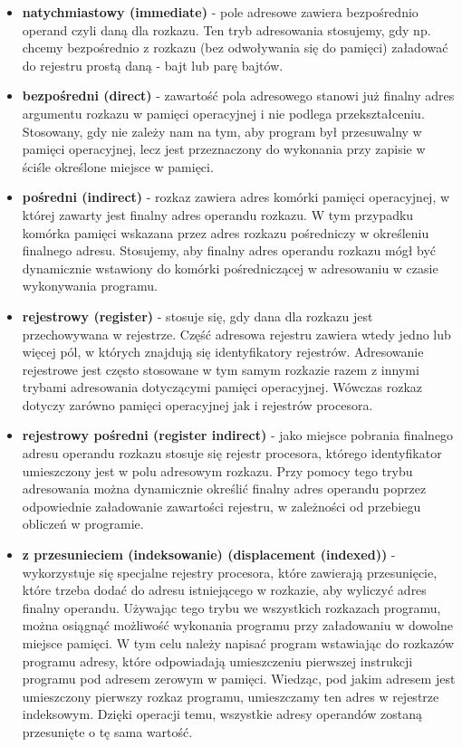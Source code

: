 \documentclass[12pt,a4paper]{article}
\begin{document}
	\begin{itemize}
		\item \textbf{natychmiastowy (immediate)} - pole adresowe zawiera bezpośrednio operand czyli daną dla rozkazu. Ten tryb adresowania stosujemy, gdy np. chcemy bezpośrednio z rozkazu (bez odwoływania się do pamięci) załadować do rejestru prostą daną - bajt lub parę bajtów.
		\item \textbf{bezpośredni (direct)} - zawartość pola adresowego stanowi już finalny adres argumentu rozkazu w pamięci operacyjnej i nie podlega przekształceniu. Stosowany, gdy nie zależy nam na tym, aby program był przesuwalny w pamięci operacyjnej, lecz jest przeznaczony do wykonania przy zapisie w ściśle określone miejsce w pamięci.
		\item \textbf{pośredni (indirect)} - rozkaz zawiera adres komórki pamięci operacyjnej, w której zawarty jest finalny adres operandu rozkazu. W tym przypadku komórka pamięci wskazana przez adres rozkazu pośredniczy w określeniu finalnego adresu. Stosujemy, aby finalny adres operandu rozkazu mógł być dynamicznie wstawiony do komórki pośredniczącej w adresowaniu w czasie wykonywania programu.
		\item \textbf{rejestrowy (register)} - stosuje się, gdy dana dla rozkazu jest przechowywana w rejestrze. Część adresowa rejestru zawiera wtedy jedno lub więcej pól, w których znajdują się identyfikatory rejestrów. Adresowanie rejestrowe jest często stosowane w tym samym rozkazie razem z innymi trybami adresowania dotyczącymi pamięci operacyjnej. Wówczas rozkaz dotyczy zarówno pamięci operacyjnej jak i rejestrów procesora.
		\item \textbf{rejestrowy pośredni (register indirect)} - jako miejsce pobrania finalnego adresu operandu rozkazu stosuje się rejestr procesora, którego identyfikator umieszczony jest w polu adresowym rozkazu. Przy pomocy tego trybu adresowania można dynamicznie określić finalny adres operandu poprzez odpowiednie załadowanie zawartości rejestru, w zależności od przebiegu obliczeń w programie.
		\item \textbf{z przesunieciem (indeksowanie) (displacement (indexed))} - wykorzystuje się specjalne rejestry procesora, które zawierają przesunięcie, które trzeba dodać do adresu istniejącego w rozkazie, aby wyliczyć adres finalny operandu. Używając tego trybu we wszystkich rozkazach programu, można osiągnąć możliwość wykonania programu przy załadowaniu w dowolne miejsce pamięci. W tym celu należy napisać program wstawiając do rozkazów programu adresy, które odpowiadają umieszczeniu pierwszej instrukcji programu pod adresem zerowym w pamięci. Wiedząc, pod jakim adresem jest umieszczony pierwszy rozkaz programu, umieszczamy ten adres w rejestrze indeksowym. Dzięki operacji temu, wszystkie adresy operandów zostaną przesunięte o tę sama wartość.
	\end{itemize}
\end{document}
